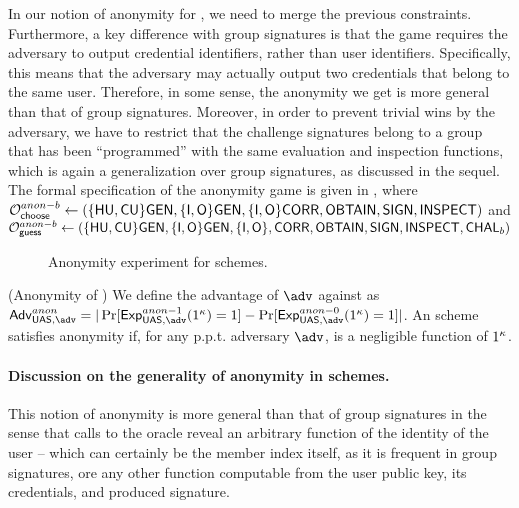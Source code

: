 In our notion of anonymity for \UAS, we need to merge the previous constraints.
Furthermore, a key difference with group signatures is that the game requires
the adversary to output credential identifiers, rather than user identifiers.
Specifically, this means that the adversary may actually output two credentials
that belong to the same user. Therefore, in some sense, the anonymity we get is
more general than that of group signatures. Moreover, in order to prevent
trivial wins by the adversary, we have to restrict that the challenge signatures
belong to a group that has been ``programmed'' with the same evaluation and
inspection functions, which is again a generalization over group signatures,
as discussed in the sequel. The formal specification of the anonymity game is
given in , where $\mathcal{O}^{anon-b}_{\mathsf{choose}} \gets (\lbrace\mathsf{HU},\mathsf{CU}\rbrace
\mathsf{GEN},\lbrace\mathsf{I},\mathsf{O}\rbrace\mathsf{GEN},\lbrace\mathsf{I},\mathsf{O}\rbrace\mathsf{CORR},\mathsf{OBTAIN},\mathsf{SIGN},
\mathsf{INSPECT})$ and $\mathcal{O}^{anon-b}_{\mathsf{guess}} \gets (\lbrace\mathsf{HU},\mathsf{CU}\rbrace\mathsf{GEN},\lbrace\mathsf{I},\mathsf{O}\rbrace
\mathsf{GEN},\lbrace\mathsf{I},\mathsf{O}\rbrace,\mathsf{CORR},\mathsf{OBTAIN},\mathsf{SIGN},\mathsf{INSPECT},\mathsf{CHAL}_b)$

\begin{figure}[htp!]
  \caption{Anonymity experiment for \UAS schemes.}
  \label{fig:exp-uas-anonb}
\end{figure}

\begin{definition}{(Anonymity of \UAS)}
  We define the advantage \AdvAnon of $\adv$ against \ExpAnonb as
  $\AdvAnon=|\Pr\lbrack\ExpAnono(1^\secpar)=1\rbrack-
  \Pr\lbrack\ExpAnonz(1^\secpar)=1\rbrack|$.
  An \UAS scheme satisfies anonymity if, for any p.p.t. adversary $\adv$,
  \AdvAnon is a negligible function of $1^\kappa$.
\end{definition}

\paragraph{Discussion on the generality of anonymity in \UAS schemes.} %
This notion of anonymity is more general than that of group signatures in the
sense that calls to the \INSPECT oracle reveal an arbitrary function of the
identity of the user -- which can certainly be the member index itself, as it
is frequent in group signatures, ore any other function computable from the
user public key, its credentials, and produced signature. 

